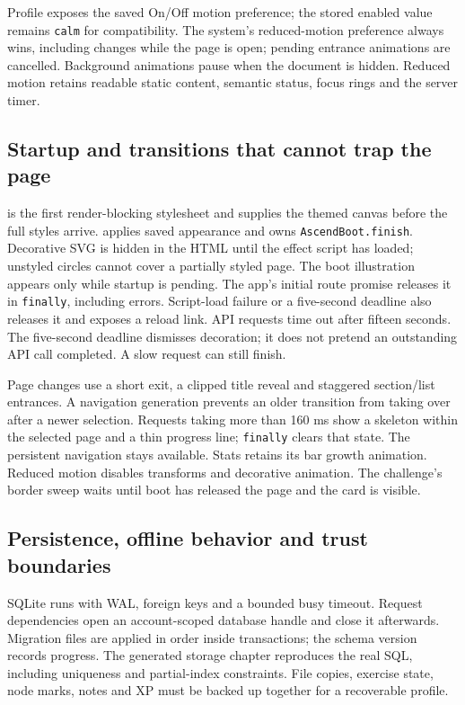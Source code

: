Profile exposes the saved On/Off motion preference; the stored enabled value remains
\texttt{calm} for compatibility. The system's reduced-motion preference always wins, including
changes while the page is open; pending entrance animations are cancelled.
Background animations pause when the document is hidden. Reduced motion retains
readable static content, semantic status, focus rings and the server timer.

\subsection{Startup and transitions that cannot trap the page}
 is the first render-blocking stylesheet and supplies the themed
canvas before the full styles arrive.  applies saved appearance
and owns \texttt{AscendBoot.finish}. Decorative SVG is hidden in the HTML until
the effect script has loaded; unstyled circles cannot cover a partially styled page.
The boot illustration appears only while startup is pending. The app's initial
route promise releases it in \texttt{finally}, including errors. Script-load failure
or a five-second deadline also releases it and exposes a reload link. API requests
time out after fifteen seconds. The five-second deadline dismisses decoration; it
does not pretend an outstanding API call completed. A slow request can still finish.

Page changes use a short exit, a clipped title reveal and staggered section/list
entrances. A navigation generation prevents an older transition from taking over
after a newer selection. Requests taking more than 160 ms show a skeleton within
the selected page and a thin progress line; \texttt{finally} clears that state.
The persistent navigation stays available. Stats retains its bar growth animation.
Reduced motion disables transforms and decorative animation. The challenge's border
sweep waits until boot has released the page and the card is visible.

\subsection{Persistence, offline behavior and trust boundaries}
SQLite runs with WAL, foreign keys and a bounded busy timeout. Request dependencies
open an account-scoped database handle and close it afterwards. Migration files
are applied in order inside transactions; the schema version records progress.
The generated storage chapter reproduces the real SQL, including uniqueness and
partial-index constraints. File copies, exercise state, node marks, notes and XP
must be backed up together for a recoverable profile.

